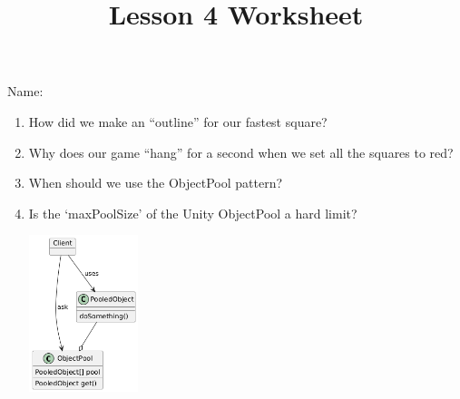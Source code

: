 \documentclass[12pt]{../rhitcsse}
\title{Lesson 4 Worksheet}
\begin{document}
\maketitle

\vspace*{0.15in}\hspace{0.25in}Name:\hrulefill\hspace{0.25in}\hspace{0.25in}

\begin{enumerate}
  \item How did we make an ``outline'' for our fastest square?
  \vfill
  
  \item Why does our game ``hang'' for a second when we set all the squares to red?
  \vfill

  \item When should we use the ObjectPool pattern?
  \vfill

  \item Is the `maxPoolSize' of the Unity ObjectPool a hard limit?
  \vfill

  \clearpage
  
\includegraphics[width=0.25\textwidth]{../figs/ObjectPool.png}

\end{enumerate}
\end{document}

